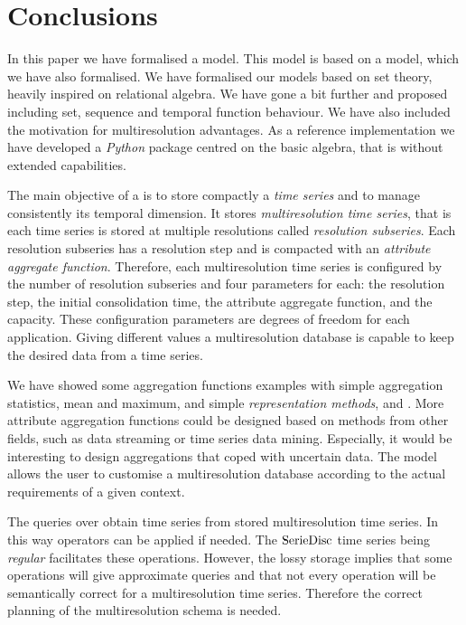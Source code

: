 \section{Conclusions}
\label{sec:concl-future-work}

In this paper we have formalised a  model. This model is
based on a  model, which we have also formalised.  We have
formalised our models based on set theory, heavily inspired on
relational algebra. We have gone a bit further and proposed
 including set, sequence and temporal function
behaviour. We have also included the motivation for multiresolution
advantages.  As a reference implementation we have developed a
\emph{Python} package centred on the basic algebra, that is without
extended  capabilities.



The main objective of a  is to store compactly a \emph{time
series} and to manage consistently its temporal dimension.  It stores
\emph{multiresolution time series}, that is each time series is stored at
multiple resolutions called \emph{resolution subseries}.  Each resolution
subseries has a resolution step and is compacted with an \emph{attribute
aggregate function}. Therefore, each multiresolution time series is
configured by the number of resolution subseries and four parameters
for each: the resolution step, the initial consolidation time, the
attribute aggregate function, and the capacity.  These configuration
parameters are degrees of freedom for each application. Giving
different values a multiresolution database is capable to keep the
desired data from a time series. %

We have showed some aggregation functions examples with simple
aggregation statistics, mean and maximum, and simple \emph{representation
methods}, \dd{} and \zohe{}. More attribute aggregation functions could
be designed based on methods from other fields, such as data streaming
or time series data mining. Especially, it would be interesting to
design aggregations that coped with uncertain data.  The model allows
the user to customise a multiresolution database according to the
actual requirements of a given context.

The queries over  obtain time series from stored
multiresolution time series. In this way  operators can be
applied if needed. The $\operatorname{SerieDisc}$ time series being \emph{regular}
facilitates these operations. However, the lossy storage implies that
some operations will give approximate queries and that not every
 operation will be semantically correct for a
multiresolution time series. Therefore the correct planning of the
multiresolution schema is needed.


